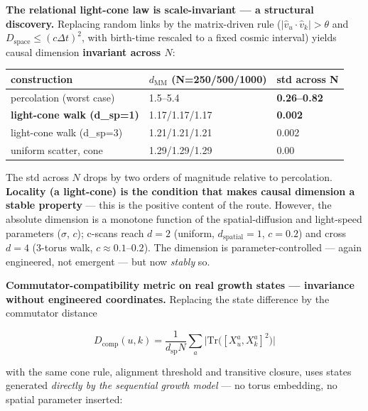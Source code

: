 \textbf{The relational light-cone law is scale-invariant --- a
structural discovery.} Replacing random links by the matrix-driven rule
(\(|\hat v_u\cdot\hat v_k|>\theta\) and
\(D_{\mathrm{space}}\le(c\Delta t)^2\), with birth-time rescaled to a
fixed cosmic interval) yields causal dimension \textbf{invariant across
\(N\)}:

{\def\LTcaptype{none} %
\begin{longtable}[]{@{}lll@{}}
\toprule\noalign{}
construction & \(d_{\mathrm{MM}}\) (N=250/500/1000) & std across N \\
\midrule\noalign{}
\endhead
\bottomrule\noalign{}
\endlastfoot
percolation (worst case) & 1.5--5.4 & \textbf{0.26--0.82} \\
\textbf{light-cone walk (d\_sp=1)} & 1.17/1.17/1.17 & \textbf{0.002} \\
light-cone walk (d\_sp=3) & 1.21/1.21/1.21 & 0.002 \\
uniform scatter, cone & 1.29/1.29/1.29 & 0.00 \\
\end{longtable}
}

The std across \(N\) drops by two orders of magnitude relative to
percolation. \textbf{Locality (a light-cone) is the condition that makes
causal dimension a stable property} --- this is the positive content of
the route. However, the absolute dimension is a monotone function of the
spatial-diffusion and light-speed parameters (\(\sigma\), \(c\));
c-scans reach \(d=2\) (uniform, \(d_{\mathrm{spatial}}=1\), \(c=0.2\))
and cross \(d=4\) (3-torus walk, \(c\approx0.1\)--\(0.2\)). The
dimension is parameter-controlled --- again engineered, not emergent ---
but now \emph{stably} so.

\textbf{Commutator-compatibility metric on real growth states ---
invariance without engineered coordinates.} Replacing the state
difference by the commutator distance

\[D_{\mathrm{comp}}(u,k)=\frac{1}{d_{\mathrm{sp}}N}\sum_a \big|\mathrm{Tr}\big([X^a_u,X^a_k]^2\big)\big|\]

with the same cone rule, alignment threshold and transitive closure,
uses states generated \emph{directly by the sequential growth model} ---
no torus embedding, no spatial parameter inserted:


